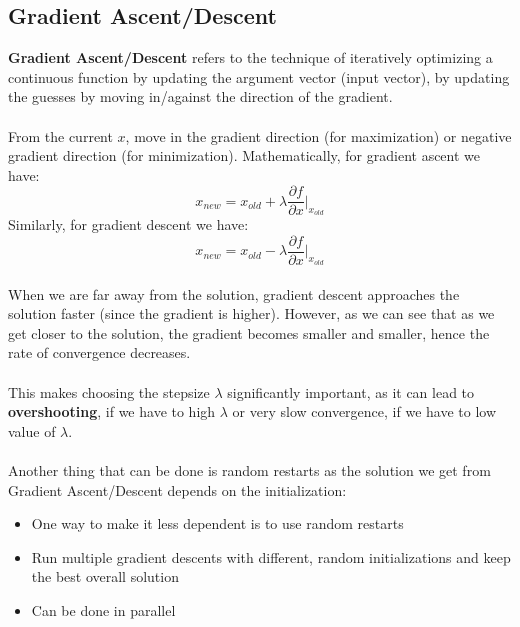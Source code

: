 \documentclass[12pt, a4paper]{book}
\begin{document}
\subsection{Gradient Ascent/Descent}
\textbf{Gradient Ascent/Descent} refers to the technique of iteratively optimizing a continuous function by updating the argument vector (input vector), by updating the guesses by moving in/against the direction of the gradient.\\\\
From the current $x$, move in the gradient direction (for maximization) or negative gradient direction (for minimization). Mathematically, for gradient ascent we have:
$$x_{new} = x_{old} + \lambda \frac{\partial f}{\partial x}\Big|_{x_{old}}$$
Similarly, for gradient descent we have:
$$x_{new} = x_{old} - \lambda \frac{\partial f}{\partial x}\Big|_{x_{old}}$$\\
When we are far away from the solution, gradient descent approaches the solution faster (since the gradient is higher). However, as we can see that as we get closer to the solution, the gradient becomes smaller and smaller, hence the rate of convergence decreases.\\\\
This makes choosing the stepsize $\lambda$ significantly important, as it can lead to \textbf{overshooting}, if we have to high $\lambda$ or very slow convergence, if we have to low value of $\lambda$.\\\\
Another thing that can be done is random restarts as the solution we get from Gradient Ascent/Descent depends on the initialization:
\begin{itemize}
    \item One way to make it less dependent is to use random restarts
    \item Run multiple gradient descents with different, random initializations and keep the best overall solution
    \item Can be done in parallel
\end{itemize}
\end{document}
